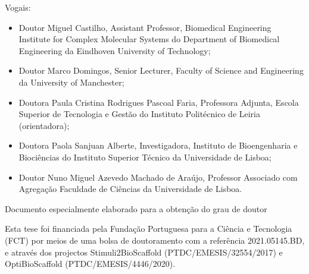 \documentclass[12pt]{report}
\begin{document}
\begin{titlepage}
{\raggedright
Vogais:
\begin{itemize}
\setlength{\itemsep}{1pt}
\setlength{\parskip}{0pt}
\setlength{\parsep}{0pt}
\item Doutor Miguel Castilho, Assistant Professor, Biomedical Engineering Institute for Complex Molecular Systems do Department of Biomedical Engineering da Eindhoven University of Technology;
\item Doutor Marco Domingos, Senior Lecturer, Faculty of Science and Engineering da University of Manchester;
\item Doutora Paula Cristina Rodrigues Pascoal Faria, Professora Adjunta, Escola Superior de Tecnologia e Gestão do Instituto Politécnico de Leiria (orientadora);
\item Doutora Paola Sanjuan Alberte, Investigadora, Instituto de Bioengenharia e Biociências do Instituto Superior Técnico da Universidade de Lisboa;
\item Doutor Nuno Miguel Azevedo Machado de Araújo, Professor Associado com Agregação Faculdade de Ciências da Universidade de Lisboa.
\end{itemize}}
{\fontsize{12}{14}\selectfont Documento especialmente elaborado para a obtenção do grau de doutor\\}
\vspace{1em}
{\fontsize{10}{11}\selectfont Esta tese foi financiada pela Fundação Portuguesa para a Ciência e Tecnologia (FCT) por meios de uma bolsa de doutoramento com a referência 2021.05145.BD, e através dos projectos Stimuli2BioScaffold (PTDC/EMESIS/32554/2017) e OptiBioScaffold (PTDC/EMESIS/4446/2020).\par}
\vspace{2em}
{\fontsize{14}{17}}
\end{titlepage}
\restoregeometry

\shipout\null
\end{document}
